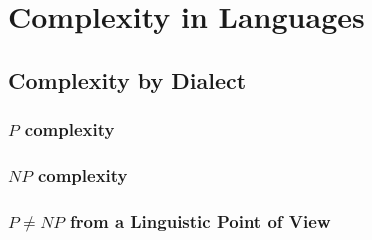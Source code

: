 \section{Complexity in Languages}
\label{sec:complexity}
\subsection{Complexity by Dialect} %
\label{sub:Complexity by Dialect}
\subsubsection{$P$ complexity} %
\label{ssub:P-complexity}

\subsubsection{$NP$ complexity} %
\label{ssub:NP-complexity}

\subsubsection{$P \neq NP$ from a Linguistic Point of View} %
\label{ssub:PNP from a Linguistic Point of View}


